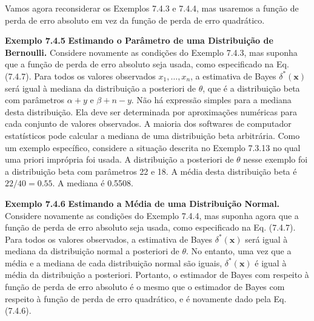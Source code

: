 \vspace{1cm}
Vamos agora reconsiderar os Exemplos 7.4.3 e 7.4.4, mas usaremos a função de perda de erro absoluto em vez da função de perda de erro quadrático.

\vspace{1cm}
\noindent\textbf{Exemplo 7.4.5} \quad \textbf{Estimando o Parâmetro de uma Distribuição de Bernoulli.} Considere novamente as condições do Exemplo 7.4.3, mas suponha que a função de perda de erro absoluto seja usada, como especificado na Eq. (7.4.7). Para todos os valores observados $x_1, \dots, x_n$, a estimativa de Bayes $\delta^*(\mathbf{x})$ será igual à mediana da distribuição a posteriori de $\theta$, que é a distribuição beta com parâmetros $\alpha+y$ e $\beta+n-y$. Não há expressão simples para a mediana desta distribuição. Ela deve ser determinada por aproximações numéricas para cada conjunto de valores observados. A maioria dos softwares de computador estatísticos pode calcular a mediana de uma distribuição beta arbitrária.
Como um exemplo específico, considere a situação descrita no Exemplo 7.3.13 no qual uma priori imprópria foi usada. A distribuição a posteriori de $\theta$ nesse exemplo foi a distribuição beta com parâmetros 22 e 18. A média desta distribuição beta é $22/40 = 0.55$. A mediana é 0.5508.

\vspace{1cm}
\noindent\textbf{Exemplo 7.4.6} \quad \textbf{Estimando a Média de uma Distribuição Normal.} Considere novamente as condições do Exemplo 7.4.4, mas suponha agora que a função de perda de erro absoluto seja usada, como especificado na Eq. (7.4.7). Para todos os valores observados, a estimativa de Bayes $\delta^*(\mathbf{x})$ será igual à mediana da distribuição normal a posteriori de $\theta$. No entanto, uma vez que a média e a mediana de cada distribuição normal são iguais, $\delta^*(\mathbf{x})$ é igual à média da distribuição a posteriori. Portanto, o estimador de Bayes com respeito à função de perda de erro absoluto é o mesmo que o estimador de Bayes com respeito à função de perda de erro quadrático, e é novamente dado pela Eq. (7.4.6).

